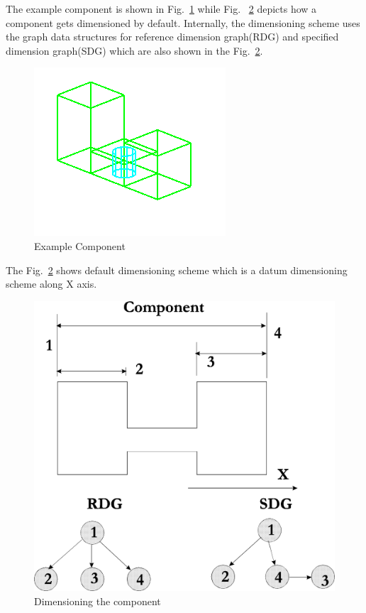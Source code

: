 		The example component is shown in Fig.~\ref{ex1comp} while Fig. ~\ref{ex1dim1} depicts how a component gets 
		dimensioned by default. Internally,
		the dimensioning scheme uses the graph data structures for reference
		dimension graph(RDG) and specified dimension graph(SDG) which are also 
		shown in the Fig.~\ref{ex1dim1}.
        \begin{figure}[htbp]
            \hspace{4cm}
            \includegraphics[scale=2.8]{EX1COMP.png}
            \caption{Example Component}
            \label{ex1comp}
        \end{figure}
  

		The Fig.~\ref{ex1dim1} shows default dimensioning scheme which is a
		datum dimensioning scheme along X axis.

       \begin{figure}[htbp]
                      \hspace{4cm}
            \includegraphics[scale=0.5]{SPEDIM.png}
            \caption{Dimensioning the component}
            \label{ex1dim1}
        \end{figure}
        
